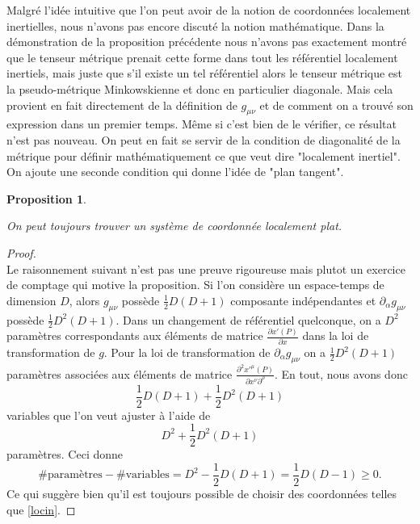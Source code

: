 \documentclass[a4paper,11pt]{report}
\theoremstyle{definition}
\theoremstyle{plain}
\newtheorem{prop}[thm]{Proposition}
\theoremstyle{definition}
\theoremstyle{remark}
\newcommand{\p}{\partial}
\begin{document}
            Malgré l'idée intuitive que l'on peut avoir de la notion de coordonnées localement inertielles, nous n'avons pas encore discuté la notion mathématique. Dans la démonstration de la proposition précédente nous n'avons pas exactement montré que le tenseur métrique prenait cette forme dans tout les référentiel localement inertiels, mais juste que s'il existe un tel référentiel alors le tenseur métrique est la pseudo-métrique Minkowskienne et donc en particulier diagonale. Mais cela provient en fait directement de la définition de $g_{\mu\nu}$ et de comment on a trouvé son expression dans un premier temps. Même si c'est bien de le vérifier, ce résultat n'est pas nouveau. On peut en fait se servir de la condition de diagonalité de la métrique pour définir mathématiquement ce que veut dire "localement inertiel". On ajoute une seconde condition qui donne l'idée de "plan tangent".
            
            \begin{prop}\begin{leftbar}
                On peut toujours trouver un système de coordonnée localement plat.
            \end{leftbar}\end{prop}
            
            \begin{proof}
            ${}$\\
                Le raisonnement suivant n'est pas une preuve rigoureuse mais plutot un exercice de comptage qui motive la proposition. Si l'on considère un espace-temps de dimension $D$, alors $g_{\mu\nu}$ possède $\frac{1}{2}D(D+1)$ composante indépendantes et $\p_\alpha g_{\mu\nu}$ possède $\frac{1}{2}D^2(D+1)$. Dans un changement de référentiel quelconque, on a $D^2$ paramètres correspondants aux éléments de matrice $\frac{\p x'(P)}{\p x}$ dans la loi de transformation de $g$. Pour la loi de transformation de $\p_\alpha g_{\mu\nu}$ on a $\frac{1}{2}D^2(D+1)$ paramètres associées aux éléments de matrice $\frac{\p^2 x'^\mu(P)}{\p x^\nu\p^\rho}$. En tout, nous avons donc
                \begin{equation}
                    \frac{1}{2}D(D+1)+\frac{1}{2}D^2(D+1)
                \end{equation}
                variables que l'on veut ajuster à l'aide de
                \begin{equation}
                    D^2+\frac{1}{2}D^2(D+1)
                \end{equation}
                paramètres. Ceci donne
                \begin{equation}
                    \#\text{paramètres}-\#\text{variables} = D^2-\frac{1}{2}D(D+1) = \frac{1}{2}D(D-1)\geq0.
                \end{equation}
                Ce qui suggère bien qu'il est toujours possible de choisir des coordonnées telles que \ref{locin}.
            \end{proof}
            
\end{document}
